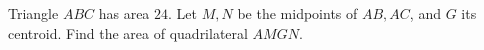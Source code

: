 Triangle $ABC$ has area $24$. Let $M,N$ be the midpoints of $AB,AC$, and $G$ its centroid. Find the area of quadrilateral $AMGN$.
